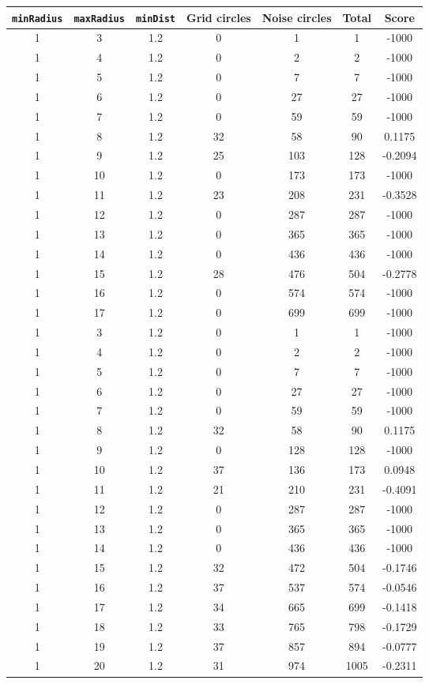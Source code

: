 \documentclass[letterpaper, 12pt]{article}
\begin{document}
\begin{longtable}{|c|c|c|c|c|c|c|}
\hline
\textbf{\texttt{minRadius}} & \textbf{\texttt{maxRadius}} & \textbf{\texttt{minDist}} & \textbf{Grid circles} & \textbf{Noise circles} & \textbf{Total} & \textbf{Score} \\
\hline
1 & 3 & 1.2 & 0 & 1 & 1 & -1000 \\
\hline
1 & 4 & 1.2 & 0 & 2 & 2 & -1000 \\
\hline
1 & 5 & 1.2 & 0 & 7 & 7 & -1000 \\
\hline
1 & 6 & 1.2 & 0 & 27 & 27 & -1000 \\
\hline
1 & 7 & 1.2 & 0 & 59 & 59 & -1000 \\
\hline
1 & 8 & 1.2 & 32 & 58 & 90 & 0.1175 \\
\hline
1 & 9 & 1.2 & 25 & 103 & 128 & -0.2094 \\
\hline
1 & 10 & 1.2 & 0 & 173 & 173 & -1000 \\
\hline
1 & 11 & 1.2 & 23 & 208 & 231 & -0.3528 \\
\hline
1 & 12 & 1.2 & 0 & 287 & 287 & -1000 \\
\hline
1 & 13 & 1.2 & 0 & 365 & 365 & -1000 \\
\hline
1 & 14 & 1.2 & 0 & 436 & 436 & -1000 \\
\hline
1 & 15 & 1.2 & 28 & 476 & 504 & -0.2778 \\
\hline
1 & 16 & 1.2 & 0 & 574 & 574 & -1000 \\
\hline
1 & 17 & 1.2 & 0 & 699 & 699 & -1000 \\
\hline
1 & 3 & 1.2 & 0 & 1 & 1 & -1000 \\
\hline
1 & 4 & 1.2 & 0 & 2 & 2 & -1000 \\
\hline
1 & 5 & 1.2 & 0 & 7 & 7 & -1000 \\
\hline
1 & 6 & 1.2 & 0 & 27 & 27 & -1000 \\
\hline
1 & 7 & 1.2 & 0 & 59 & 59 & -1000 \\
\hline
1 & 8 & 1.2 & 32 & 58 & 90 & 0.1175 \\
\hline
1 & 9 & 1.2 & 0 & 128 & 128 & -1000 \\
\hline
1 & 10 & 1.2 & 37 & 136 & 173 & 0.0948 \\
\hline
1 & 11 & 1.2 & 21 & 210 & 231 & -0.4091 \\
\hline
1 & 12 & 1.2 & 0 & 287 & 287 & -1000 \\
\hline
1 & 13 & 1.2 & 0 & 365 & 365 & -1000 \\
\hline
1 & 14 & 1.2 & 0 & 436 & 436 & -1000 \\
\hline
1 & 15 & 1.2 & 32 & 472 & 504 & -0.1746 \\
\hline
1 & 16 & 1.2 & 37 & 537 & 574 & -0.0546 \\
\hline
1 & 17 & 1.2 & 34 & 665 & 699 & -0.1418 \\
\hline
1 & 18 & 1.2 & 33 & 765 & 798 & -0.1729 \\
\hline
1 & 19 & 1.2 & 37 & 857 & 894 & -0.0777 \\
\hline
1 & 20 & 1.2 & 31 & 974 & 1005 & -0.2311 \\
\hline
\end{longtable}
\end{document}

